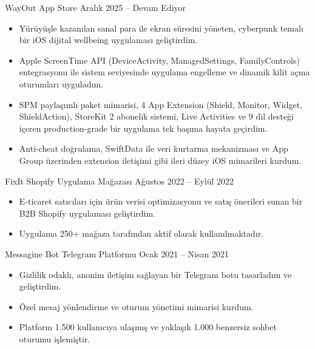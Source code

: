 \resumeProject
  {WayOut}
  {App Store}
  {}
  {Aralık 2025 -- Devam Ediyor}
\begin{itemize}
  \item Yürüyüşle kazanılan sanal para ile ekran süresini yöneten, cyberpunk temalı bir iOS dijital wellbeing uygulaması geliştirdim.
  \item Apple ScreenTime API (DeviceActivity, ManagedSettings, FamilyControls) entegrasyonu ile sistem seviyesinde uygulama engelleme ve dinamik kilit açma oturumları uyguladım.
  \item SPM paylaşımlı paket mimarisi, 4 App Extension (Shield, Monitor, Widget, ShieldAction), StoreKit 2 abonelik sistemi, Live Activities ve 9 dil desteği içeren production-grade bir uygulama tek başıma hayata geçirdim.
  \item Anti-cheat doğrulama, SwiftData ile veri kurtarma mekanizması ve App Group üzerinden extension iletişimi gibi ileri düzey iOS mimarileri kurdum.
\end{itemize}
\vspace{0.25em}

\resumeProject
  {FixIt}
  {Shopify Uygulama Mağazası}
  {}
  {Ağustos 2022 -- Eylül 2022}
\begin{itemize}
  \item E-ticaret satıcıları için ürün verisi optimizasyonu ve satış önerileri sunan bir B2B Shopify uygulaması geliştirdim.
  \item Uygulama 250+ mağaza tarafından aktif olarak kullanılmaktadır.
\end{itemize}
\vspace{0.25em}

\resumeProject
  {Messagine Bot}
  {Telegram Platformu}
  {}
  {Ocak 2021 -- Nisan 2021}
\begin{itemize}
  \item Gizlilik odaklı, anonim iletişim sağlayan bir Telegram botu tasarladım ve geliştirdim.
  \item Özel mesaj yönlendirme ve oturum yönetimi mimarisi kurdum.
  \item Platform 1.500 kullanıcıya ulaşmış ve yaklaşık 1.000 benzersiz sohbet oturumu işlemiştir.
\end{itemize}
